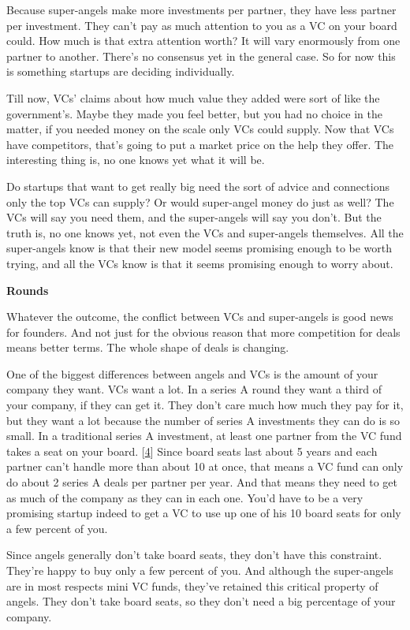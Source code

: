 Because super-angels make more investments per partner, they have less
partner per investment. They can't pay as much attention to you as a VC
on your board could. How much is that extra attention worth? It will
vary enormously from one partner to another. There's no consensus yet in
the general case. So for now this is something startups are deciding
individually.

Till now, VCs' claims about how much value they added were sort of like
the government's. Maybe they made you feel better, but you had no choice
in the matter, if you needed money on the scale only VCs could supply.
Now that VCs have competitors, that's going to put a market price on the
help they offer. The interesting thing is, no one knows yet what it will
be.

Do startups that want to get really big need the sort of advice and
connections only the top VCs can supply? Or would super-angel money do
just as well? The VCs will say you need them, and the super-angels will
say you don't. But the truth is, no one knows yet, not even the VCs and
super-angels themselves. All the super-angels know is that their new
model seems promising enough to be worth trying, and all the VCs know is
that it seems promising enough to worry about.

\textbf{Rounds}

Whatever the outcome, the conflict between VCs and super-angels is good
news for founders. And not just for the obvious reason that more
competition for deals means better terms. The whole shape of deals is
changing.

One of the biggest differences between angels and VCs is the amount of
your company they want. VCs want a lot. In a series A round they want a
third of your company, if they can get it. They don't care much how much
they pay for it, but they want a lot because the number of series A
investments they can do is so small. In a traditional series A
investment, at least one partner from the VC fund takes a seat on your
board. {[}\hyperref[f4n]{4}{]} Since board seats last about 5 years and
each partner can't handle more than about 10 at once, that means a VC
fund can only do about 2 series A deals per partner per year. And that
means they need to get as much of the company as they can in each one.
You'd have to be a very promising startup indeed to get a VC to use up
one of his 10 board seats for only a few percent of you.

Since angels generally don't take board seats, they don't have this
constraint. They're happy to buy only a few percent of you. And although
the super-angels are in most respects mini VC funds, they've retained
this critical property of angels. They don't take board seats, so they
don't need a big percentage of your company.


